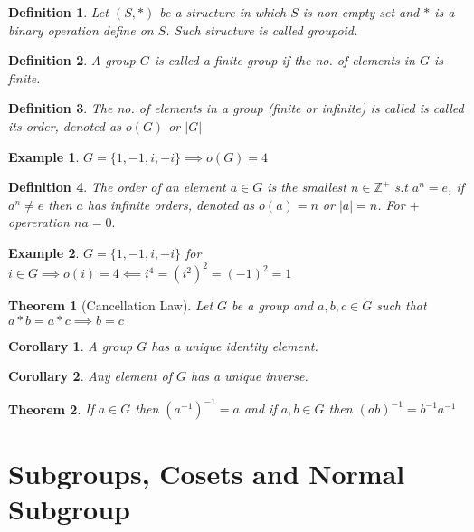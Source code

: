 \documentclass[12pt,a4paper]{article}
\newcommand{\Z}{\mathbb{Z}}
\newtheorem{thm}{Theorem}
\newtheorem*{defn}{Definition}
\newtheorem*{cor}{Corollary}
\newtheorem{ex}{Example}
\begin{document}
\begin{defn}
	Let $(S,*)$ be a structure in which $S$ is non-empty set and $*$ is a binary operation define on $S$. Such structure is called groupoid.
\end{defn}

\begin{defn}
	A group $G$ is called a finite group if the no. of elements in $G$ is finite.
\end{defn}
\begin{defn}
	The no. of elements in a group (finite or infinite) is called is called its order, denoted as $o(G)$ or $|G|$
\end{defn}
\begin{ex}
	$G=\{1,-1,i,-i\} \implies o(G)=4$ 
\end{ex}
\begin{defn}
	The order of an element $a \in G$ is the smallest $n \in \Z^+$ s.t $a^n=e$, if $a^n \ne e$ then $a$ has infinite orders, denoted as $o(a)=n$ or $|a|=n$. For $+$ opereration $na=0.$
\end{defn}
\begin{ex}
	$G=\{1,-1,i,-i\}$ for $i \in G \implies o(i)=4 \impliedby i^4=(i^2)^2=(-1)^2=1$
\end{ex}

\begin{thm}[Cancellation Law]
	  Let $G$ be a group and $a,b,c\in G$ such that $a*b=a*c \implies b=c$
\end{thm}
\begin{cor}
	A group $G$ has a unique identity element.
\end{cor}
\begin{cor}
	Any element of $G$ has a unique inverse.
\end{cor}
\begin{thm} 
	If $a\in G$ then $(a^{-1})^{-1}=a$ and if $a,b\in G$ then $(ab)^{-1}=b^{-1}a^{-1}$
\end{thm}


\section{Subgroups, Cosets and Normal Subgroup}
\end{document}
